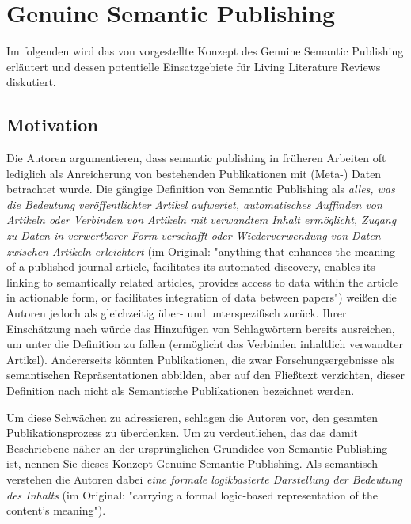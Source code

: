 \section{Genuine Semantic Publishing}
\label{sec:genuine-semantic-publishing}

Im folgenden wird das von \citet{kuhn2017genuine} vorgestellte Konzept des Genuine Semantic Publishing erläutert und dessen potentielle Einsatzgebiete für Living Literature Reviews diskutiert.

\subsection{Motivation}
\label{subsec:motivation}

Die Autoren argumentieren, dass semantic publishing in früheren Arbeiten oft lediglich als Anreicherung von bestehenden Publikationen mit (Meta-) Daten betrachtet wurde.
Die gängige Definition von Semantic Publishing als \textit{alles, was die Bedeutung veröffentlichter Artikel aufwertet, automatisches Auffinden von Artikeln oder Verbinden von Artikeln mit verwandtem Inhalt ermöglicht, Zugang zu Daten in verwertbarer Form verschafft oder Wiederverwendung von Daten zwischen Artikeln erleichtert} (im Original: "anything that enhances the meaning of a published journal article, facilitates its automated discovery, enables its linking to semantically related articles, provides access to data within the article in actionable form, or facilitates integration of data between papers") \cite{kuhn2017genuine} weißen die Autoren jedoch als gleichzeitig über- und unterspezifisch zurück.
Ihrer Einschätzung nach würde das Hinzufügen von Schlagwörtern bereits ausreichen, um unter die Definition zu fallen (ermöglicht das Verbinden inhaltlich verwandter Artikel).
Andererseits könnten Publikationen, die zwar Forschungsergebnisse als semantischen Repräsentationen abbilden, aber auf den Fließtext verzichten, dieser Definition nach nicht als Semantische Publikationen bezeichnet werden.

Um diese Schwächen zu adressieren, schlagen die Autoren vor, den gesamten Publikationsprozess zu überdenken.
Um zu verdeutlichen, das das damit Beschriebene näher an der ursprünglichen Grundidee von Semantic Publishing ist, nennen Sie dieses Konzept Genuine Semantic Publishing.
Als semantisch verstehen die Autoren dabei \textit{eine formale logikbasierte Darstellung der Bedeutung des Inhalts} (im Original: "carrying a formal logic-based representation of the content's meaning").

